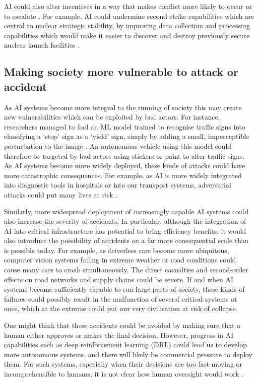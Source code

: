 \documentclass{article}
\begin{document}
AI could also alter incentives in a way that makes conflict more likely to occur or to escalate \citep{zwetsloot_thinking_2019}. For example, AI could undermine second strike capabilities which are central to nuclear strategic stability, by improving data collection and processing capabilities which would make it easier to discover and destroy previously secure nuclear launch facilities \citep{geist_how_2018,lieber_new_2017}.

\subsection{Making society more vulnerable to attack or accident}

As AI systems become more integral to the running of society this may create new vulnerabilities which can be exploited by bad actors. For instance, researchers managed to fool an ML model trained to recognise traffic signs into classifying a ‘stop’ sign as a ‘yield’ sign, simply by adding a small, imperceptible perturbation to the image \citep{papernot_practical_2017}. An autonomous vehicle using this model could therefore be targeted by bad actors using stickers or paint to alter traffic signs. As AI systems become more widely deployed, these kinds of attacks could have more catastrophic consequences. For example, as AI is more widely integrated into diagnostic tools in hospitals or into our transport systems, adversarial attacks could put many lives at risk \citep{finlayson_adversarial_2019,brundage_malicious_2018}.

Similarly, more widespread deployment of increasingly capable AI systems could also increase the severity of accidents. In particular, although the integration of AI into critical infrastructure has potential to bring efficiency benefits, it would also introduce the possibility of accidents on a far more consequential scale than is possible today. For example, as driverless cars become more ubiquitous, computer vision systems failing in extreme weather or road conditions could cause many cars to crash simultaneously. The direct casualties and second-order effects on road networks and supply chains could be severe. If and when AI systems become sufficiently capable to run large parts of society, these kinds of failures could possibly result in the malfunction of several critical systems at once, which at the extreme could put our very civilisation at risk of collapse.

One might think that these accidents could be avoided by making sure that a human either approves or makes the final decision. However, progress in AI capabilities such as deep reinforcement learning (DRL) could lead us to develop more autonomous systems, and there will likely be commercial pressure to deploy them. For such systems, especially when their decisions are too fast-moving or incomprehensible to humans, it is not clear how human oversight would work \citep{whittlestone_societal_2021}. 
\end{document}
